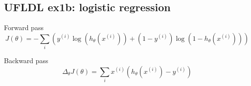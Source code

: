 \subsection{UFLDL ex1b: logistic regression}

Forward pass
$$ J(\theta) = - \sum_i (y^{(i)} \log(h_\theta(x^{(i)})) 
   + (1-y^{(i)}) \log(1-h_\theta(x^{(i)}))) $$

Backward pass
$$ \Delta_\theta J(\theta) = \sum_i x^{(i)} (h_\theta (x^{(i)}) - y^{(i)}) $$

%
%
%
%
%
%
%
%
%
%
%
%
